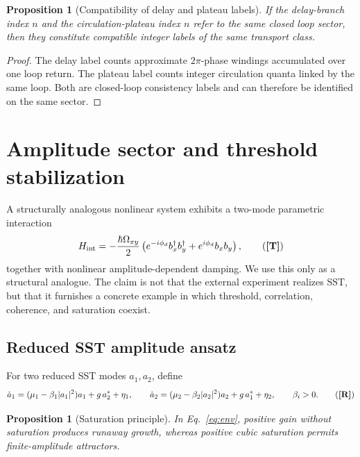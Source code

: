 \documentclass[11pt]{article}
\newcommand{\TagT}{\textbf{[T]}} %
\newcommand{\TagD}{\textbf{[D]}} %
\newcommand{\TagR}{\textbf{[R]}} %
\theoremstyle{definition}
\theoremstyle{plain}
\newtheorem{proposition}[definition]{Proposition}
\begin{document}
\begin{proposition}[Compatibility of delay and plateau labels]
If the delay-branch index \(n\) and the circulation-plateau index \(n\) refer to the same closed loop sector, then they constitute compatible integer labels of the same transport class.
\tag{\TagD}
\label{prop:compatibility}
\end{proposition}

\begin{proof}
The delay label counts approximate \(2\pi\)-phase windings accumulated over one loop return. The plateau label counts integer circulation quanta linked by the same loop. Both are closed-loop consistency labels and can therefore be identified on the same sector.
\end{proof}

\section{Amplitude sector and threshold stabilization}\label{sec:amplitude}

A structurally analogous nonlinear system exhibits a two-mode parametric interaction
\begin{equation}
H_{\rm int}
=
-\frac{\hbar \Omega_{xy}}{2}
\left(
e^{-i\phi_d} b_x^\dagger b_y^\dagger
+
e^{i\phi_d} b_x b_y
\right),
\tag{\TagT}
\label{eq:phononH}
\end{equation}
together with nonlinear amplitude-dependent damping. We use this only as a structural analogue. The claim is not that the external experiment realizes SST, but that it furnishes a concrete example in which threshold, correlation, coherence, and saturation coexist.

\subsection{Reduced SST amplitude ansatz}

For two reduced SST modes \(a_1,a_2\), define
\begin{equation}
\dot{a}_1 = (\mu_1-\beta_1|a_1|^2)a_1 + g\,a_2^\ast + \eta_1,
\qquad
\dot{a}_2 = (\mu_2-\beta_2|a_2|^2)a_2 + g\,a_1^\ast + \eta_2,
\qquad
\beta_i>0.
\tag{\TagR}
\label{eq:env}
\end{equation}

\begin{proposition}[Saturation principle]
In Eq.~\eqref{eq:env}, positive gain without saturation produces runaway growth, whereas positive cubic saturation permits finite-amplitude attractors.
\tag{\TagD}
\label{prop:saturation}
\end{proposition}
\end{document}
